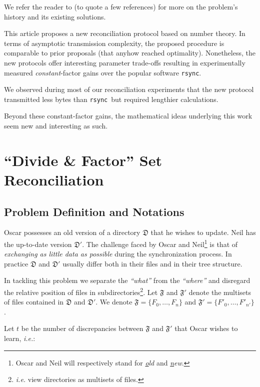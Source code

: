 \documentclass[11pt]{llncs}
\newcommand{\rsync}{\texttt{rsync}\xspace}
\begin{document}
We refer the reader to \cite{PSRec,Mins1,Whats} (to quote a few references) for more on the problem's history and its existing solutions.\smallskip

This article proposes a new reconciliation protocol based on number theory. In terms of asymptotic  transmission complexity, the proposed procedure is comparable to prior proposals (that anyhow reached optimality). Nonetheless, the new protocols offer interesting parameter trade-offs resulting in experimentally measured {\sl constant}-factor gains over the popular software \rsync.\smallskip

We observed during most of our reconciliation experiments that the new protocol transmitted less bytes than \rsync\ but required lengthier calculations.\smallskip

Beyond these constant-factor gains, the mathematical ideas underlying this work seem new and interesting as such.

\section{``Divide \& Factor'' Set Reconciliation}

\subsection{Problem Definition and Notations}

Oscar possesses an old version of a directory $\mathfrak{D}$ that he wishes to update. Neil has the up-to-date version $\mathfrak{D}'$. The challenge faced by Oscar and Neil\footnote{Oscar and Neil will respectively stand for {\sl \underline{o}ld} and {\sl \underline{n}ew}.} is that of {\sl exchanging as little data as possible} during the synchronization process. In practice $\mathfrak{D}$ and $\mathfrak{D}'$ usually differ both in their files and in their tree structure.\smallskip

In tackling this problem we separate the {\sl ``what''} from the {\sl ``where''} and disregard the relative position of files in subdirectories\footnote{{\sl i.e.} view directories as multisets of files.}. Let $\mathfrak{F}$ and $\mathfrak{F}'$ denote the multisets of files contained in $\mathfrak{D}$ and $\mathfrak{D}'$. We denote $\mathfrak{F}=\{F_0,\ldots,F_{n}\}$ and $\mathfrak{F}'=\{F'_0,\ldots,F'_{n'}\}$.\smallskip

Let $t$ be the number of discrepancies between $\mathfrak{F}$ and $\mathfrak{F}'$ that Oscar wishes to learn, {\sl i.e.}:
\end{document}
